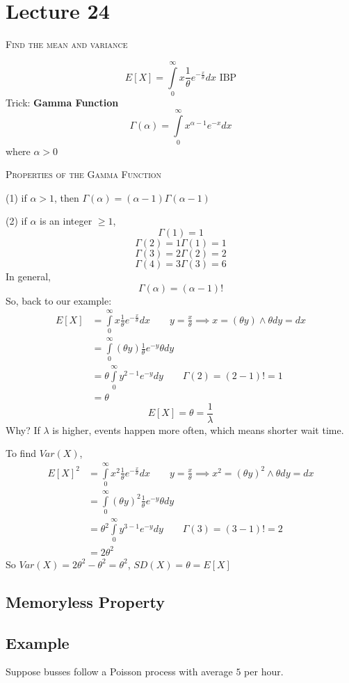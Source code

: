 \section{Lecture 24}
\textsc{Find the mean and variance}

\[ E[X]=\int\limits_{0}^{\infty} x \frac{1}{\theta}e^{-\frac{x}{\theta}} d{x}  \text{ IBP} \]
Trick: \textbf{Gamma Function}
\[ \Gamma(\alpha)=\int\limits_{0}^{\infty} x^{\alpha -1}e^{-x} d{x}  \]
where $ \alpha>0 $

\textsc{Properties of the Gamma Function}

(1) if $ \alpha>1 $, then $ \Gamma(\alpha)=(\alpha-1)\Gamma(\alpha-1) $

(2) if $ \alpha $ is an integer $ \ge 1 $,
\[ \Gamma(1)=1 \]
\[ \Gamma(2)=1\Gamma(1)=1 \]
\[ \Gamma(3)=2\Gamma(2)=2 \]
\[ \Gamma(4)=3\Gamma(3)=6 \]
In general,
\[ \Gamma(\alpha)=(\alpha-1)! \]
So, back to our example:
\begin{align*}
    E[X]&=\int\limits_{0}^{\infty} x \frac{1}{\theta}e^{-\frac{x}{\theta}} d{x}\qquad y=\frac{x}{\theta}\implies x=(\theta y) \land \theta dy=dx\\
    &=\int\limits_{0}^{\infty} (\theta y) \frac{1}{\theta} e^{-y}\theta d{y}\\
    &=\theta \int\limits_{0}^{\infty} y^{2-1}e^{-y} d{y}\qquad \Gamma(2)=(2-1)!=1\\
    &=\theta
\end{align*}
\[ E[X]=\theta=\frac{1}{\lambda} \]
Why?
If $ \lambda $ is higher, events happen more often, which means shorter wait time.

To find $ Var(X) $,
\begin{align*}
    E[X]^2&=\int\limits_{0}^{\infty} x^2 \frac{1}{\theta}e^{-\frac{x}{\theta}}  d{x}\qquad y=\frac{x}{\theta}\implies x^2=(\theta y)^2 \land \theta dy=dx\\
    &=\int\limits_{0}^{\infty} (\theta y)^2\frac{1}{\theta}e^{-y}\theta d{y}\\
    &=\theta^2 \int\limits_{0}^{\infty} y^{3-1}e^{-y} d{y} \qquad \Gamma(3)=(3-1)!=2\\
    &=2\theta^2
\end{align*}
So $ Var(X)=2\theta^2-\theta^2=\theta^2 $, $ SD(X)=\theta=E[X] $

\subsection{Memoryless Property}
\subsection{Example}
Suppose busses follow a Poisson process with average $ 5 $ per hour.

